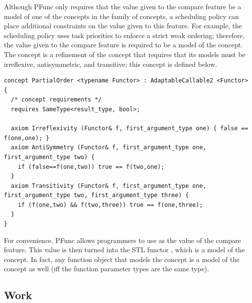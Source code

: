 Although PFunc only requires that the value given to the compare feature be a
model of one of the concepts in the  family of
concepts, a scheduling policy can place additional constraints on the value
given to this feature.
%
For example, the  scheduling policy uses task priorities to enforce
a strict weak ordering; therefore, the value given to the compare feature is
required to be a model of the  concept. 
%
The  concept is a refinement of the  concept that requires that its models must be irreflexive,
antisymmetric, and transitive; this concept is defined below.

\begin{lstlisting}[columns=flexible]
concept PartialOrder <typename Functor> : AdaptableCallable2 <Functor> {
  /* concept requirements */
  requires SameType<result_type, bool>;

  axiom Irreflexivity (Functor& f, first_argument_type one) { false == f(one,one); }
  axiom AntiSymmetry (Functor& f, first_argument_type one, first_argument_type two) { 
    if (false==f(one,two)) true == f(two,one);
  }
  axiom Transitivity (Functor& f, first_argument_type one, first_argument_type two, first_argument_type three) {
    if (f(one,two) && f(two,three)) true == f(one,three);
  }
}
\end{lstlisting}

For convenience, PFunc allows programmers to use  as 
the value of the compare feature.
%
This value is then turned into the STL functor , which 
is a model of the  concept. 
%
In fact, any function object that models the  concept
is a model of the  concept as well (iff the
function parameter types are the same type).

\subsection{Work}
\label{subsec:custom_work}

